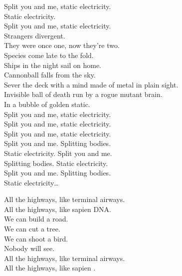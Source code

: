 Split you and me, static electricity. \\
Static electricity. \\
Split you and me, static electricity. \\

Strangers divergent. \\
They were once one, now they're two. \\
Species come late to the fold. \\
Ships in the night sail on home. \\
Cannonball falls from the sky. \\
Sever the deck with a mind made of metal in plain sight. \\
Invisible ball of death run by a rogue mutant brain. \\
In a bubble of golden static. \\

Split you and me, static electricity. \\
Split you and me, static electricity. \\
Split you and me, static electricity. \\

Split you and me. Splitting bodies. \\
Static electricity. Split you and me. \\
Splitting bodies. Static electricity. \\
Split you and me. Splitting bodies. \\
Static electricity… \\




All the highways, like terminal airways. \\
All the highways, like sapien DNA. \\

We can build a road. \\
We can cut a tree. \\
We can shoot a bird. \\
Nobody will see. \\

All the highways, like terminal airways. \\
All the highways, like sapien . \\


